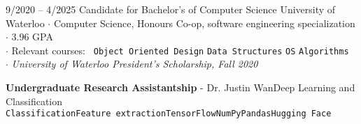 \documentclass[8pt]{developercv} %
\begin{document}


\begin{minipage}[t]{\textwidth}
	\vspace{-\baselineskip} %

	\begin{entrylist}
		\entry
			{9/2020 -- 4/2025}
			{Candidate for Bachelor's of Computer Science}
			{University of Waterloo}
			{
				$\cdot$ Computer Science, Honours Co-op, software engineering specialization\\
				$\cdot$ 3.96 GPA\\
				$\cdot$ Relevant courses:
					\texttt{ Object Oriented Design}\slashsep
					\texttt{Data Structures}\slashsep
					\texttt{OS}\slashsep
					\texttt{Algorithms}\\
				$\cdot$ \textit{University of Waterloo President's Scholarship, Fall 2020}
			}
	\end{entrylist}
\end{minipage}



	



	\begin{minipage}[t]{\textwidth}
		\vspace{-\baselineskip} %
		\textbf{Undergraduate Research Assistantship} - Dr. Justin Wan\slashsep Deep Learning and Classification \\
    \texttt{Classification}\slashsep\texttt{Feature extraction}\slashsep\texttt{TensorFlow}\slashsep\texttt{NumPy}\slashsep\texttt{Pandas}\slashsep\texttt{Hugging Face}
	\end{minipage}

\end{document}
